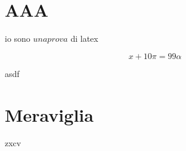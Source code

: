 \section{AAA}
io sono $una prova$ di latex

$$
x+10 \pi = 99 \alpha
$$

asdf

\section{Meraviglia}
zxcv
